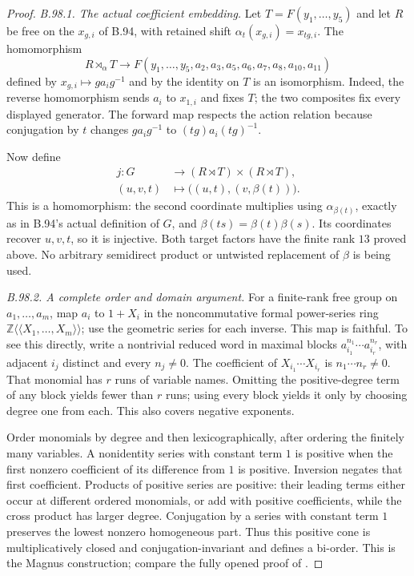 \begin{proof}
\emph{B.98.1. The actual coefficient embedding.}
Let $T=F(y_1,\ldots,y_5)$ and let $R$ be free on the
$x_{g,i}$ of B.94, with retained shift
$\alpha_t(x_{g,i})=x_{tg,i}$.  The homomorphism
\[
 R\rtimes_\alpha T\longrightarrow
 F(y_1,\ldots,y_5,a_2,a_3,a_5,a_6,a_7,a_8,a_{10},a_{11})
\]
defined by $x_{g,i}\mapsto g a_i g^{-1}$ and by the identity on
$T$ is an isomorphism.  Indeed, the reverse homomorphism sends
$a_i$ to $x_{1,i}$ and fixes $T$; the two composites fix every
displayed generator.  The forward map respects the action
relation because conjugation by $t$ changes $g a_i g^{-1}$ to
$(tg)a_i(tg)^{-1}$.

Now define
\begin{equation}\label{eq:B98-embedding}
 \begin{aligned}
 j:G&\longrightarrow (R\rtimes T)\times(R\rtimes T),\\
 (u,v,t)&\longmapsto\bigl((u,t),(v,\beta(t))\bigr).
 \end{aligned}
\end{equation}
This is a homomorphism: the second coordinate multiplies using
$\alpha_{\beta(t)}$, exactly as in B.94's actual definition of
$G$, and $\beta(ts)=\beta(t)\beta(s)$.  Its coordinates recover
$u,v,t$, so it is injective.  Both target factors have the finite
rank $13$ proved above.  No arbitrary semidirect product or
untwisted replacement of $\beta$ is being used.

\emph{B.98.2. A complete order and domain argument.}
For a finite-rank free group on $a_1,\ldots,a_m$, map
$a_i$ to $1+X_i$ in the noncommutative formal power-series ring
$\mathbb Z\langle\!\langle X_1,\ldots,X_m\rangle\!\rangle$;
use the geometric series for each inverse.  This map is faithful.
To see this directly, write a nontrivial reduced word in maximal
blocks $a_{i_1}^{n_1}\cdots a_{i_r}^{n_r}$, with adjacent
$i_j$ distinct and every $n_j\ne0$.  The coefficient of
$X_{i_1}\cdots X_{i_r}$ is $n_1\cdots n_r\ne0$.
That monomial has $r$ runs of variable names.  Omitting the
positive-degree term of any block yields fewer than $r$ runs;
using every block yields it only by choosing degree one from
each.  This also covers negative exponents.

Order monomials by degree and then lexicographically, after
ordering the finitely many variables.  A nonidentity series
with constant term $1$ is positive when the first nonzero
coefficient of its difference from $1$ is positive.  Inversion
negates that first coefficient.  Products of positive series
are positive: their leading terms either occur at different
ordered monomials, or add with positive coefficients, while
the cross product has larger degree.  Conjugation by a series
with constant term $1$ preserves the lowest nonzero homogeneous
part.  Thus this positive cone is multiplicatively closed and
conjugation-invariant and defines a bi-order.  This is the
Magnus construction; compare the fully opened proof of
\citet[\S5, Theorems2 and4]{BKimRolfsen2003}.


\end{proof}
